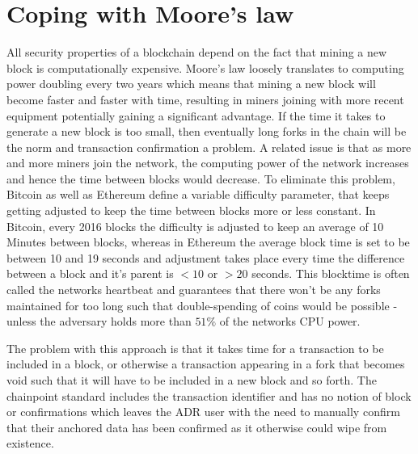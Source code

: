 \documentclass[12pt,msc,a4paper,oneside]{ucl_thesis}
\begin{document}
\section{Coping with Moore's law}
All security properties of a blockchain depend on the fact that mining a new block is computationally expensive. Moore's law loosely translates to computing power doubling every two years which means that mining a new block will become faster and faster with time, resulting in miners joining with more recent equipment potentially gaining a significant advantage. If the time it takes to generate a new block is too small, then eventually long forks in the chain will be the norm and transaction confirmation a problem. A related issue is that as more and more miners join the network, the computing power of the network increases and hence the time between blocks would decrease. To eliminate this problem, Bitcoin as well as Ethereum define a variable difficulty parameter, that keeps getting adjusted to keep the time between blocks more or less constant. In Bitcoin, every 2016 blocks the difficulty is adjusted to keep an average of 10 Minutes between blocks\cite{bitcoin_wiki:difficulty}, whereas in Ethereum the average block time is set to be between 10 and 19 seconds and adjustment takes place every time the difference between a block and it's parent is $<10$ or $>20$ seconds\cite{ethereum_wiki:homestead}. This blocktime is often called the networks heartbeat and guarantees that there won't be any forks maintained for too long such that double-spending of coins would be possible - unless the adversary holds more than $51\%$ of the networks CPU power.

The problem with this approach is that it takes time for a transaction to be included in a block, or otherwise a transaction appearing in a fork that becomes void such that it will have to be included in a new block and so forth. The chainpoint standard includes the transaction identifier and has no notion of block or confirmations which leaves the ADR user with the need to manually confirm that their anchored data has been confirmed as it otherwise could wipe from existence.
\end{document}
